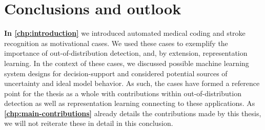 
\chapter[conclusions and outlook]{Conclusions and outlook}\label{chp:conclusion}

\textbf{In \cref{chp:introduction}} we introduced automated medical coding and stroke recognition as motivational cases. 
We used these cases to exemplify the importance of out-of-distribution detection, and, by extension, representation learning. In the context of these cases, we discussed possible machine learning system designs for decision-support and considered potential sources of uncertainty and ideal model behavior. 
As such, the cases have formed a reference point for the thesis as a whole with contributions within out-of-distribution detection as well as representation learning connecting to these applications. 
As \textbf{\cref{chp:main-contributions}} already details the contributions made by this thesis, we will not reiterate these in detail in this conclusion. 





